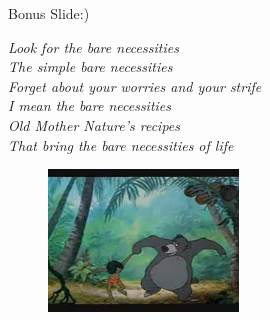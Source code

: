 \documentclass[xcolor={dvipsnames,svgnames}]{beamer}
\begin{document}


\begin{frame}{Bonus Slide:)}
\begin{exampleblock}{}
  {\large \textit{Look for the bare necessities\\
            The simple bare necessities\\
            Forget about your worries and your strife\\
            I mean the bare necessities\\
            Old Mother Nature’s recipes\\
            That bring the bare necessities of life}}
  \vskip2mm
  \hspace*{}
\end{exampleblock}
  \begin{figure}
  \href{https://www.youtube.com/watch?v=9ogQ0uge06o}{ \includegraphics[width=0.45\textwidth]{presentation/bare-necessities.jpg}}
            \end{figure} 
\end{frame}
\end{document}
